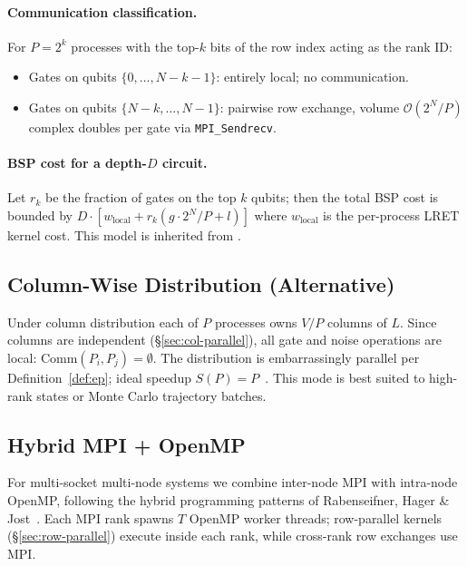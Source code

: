 \documentclass[11pt,a4paper]{article}
\begin{document}
\paragraph{Communication classification.}
For $P = 2^k$ processes with the top-$k$ bits of the row index acting as the rank ID:
\begin{itemize}
  \item Gates on qubits $\{0,\ldots,N-k-1\}$: entirely local; no communication.
  \item Gates on qubits $\{N-k,\ldots,N-1\}$: pairwise row exchange, volume
        $\mathcal{O}(2^N/P)$ complex doubles per gate via \texttt{MPI\_Sendrecv}.
\end{itemize}

\paragraph{BSP cost for a depth-$D$ circuit.}
Let $r_k$ be the fraction of gates on the top $k$ qubits; then the total BSP cost is
bounded by $D \cdot [w_\text{local} + r_k (g\cdot 2^N/P + l)]$ where $w_\text{local}$ is
the per-process LRET kernel cost. This model is inherited from
\cite{jones2019quest,pacheco1996pp}.

\subsection{Column-Wise Distribution (Alternative)}

Under column distribution each of $P$ processes owns $V/P$ columns of $L$. Since
columns are independent (\S\ref{sec:col-parallel}), all gate and noise operations are
local: $\mathrm{Comm}(P_i, P_j) = \emptyset$. The distribution is embarrassingly
parallel per Definition~\ref{def:ep}; ideal speedup $S(P) = P$~\cite{amdahl1967}.
This mode is best suited to high-rank states or Monte Carlo trajectory batches.

\subsection{Hybrid MPI + OpenMP}

For multi-socket multi-node systems we combine inter-node MPI with intra-node OpenMP,
following the hybrid programming patterns of Rabenseifner, Hager \& Jost~\cite{rabenseifner2009}.
Each MPI rank spawns $T$ OpenMP worker threads; row-parallel kernels
(\S\ref{sec:row-parallel}) execute inside each rank, while cross-rank row exchanges
use MPI.
\end{document}
